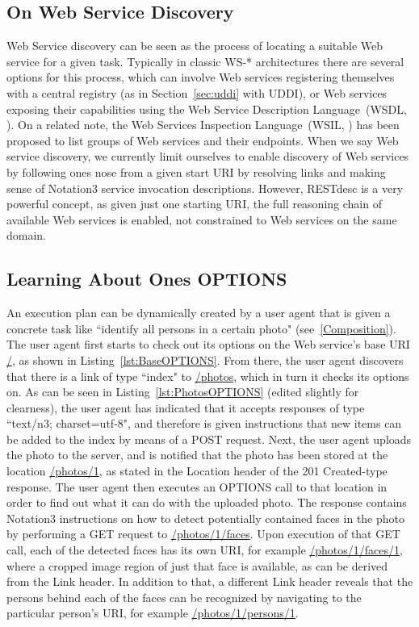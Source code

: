 \documentclass[runningheads,a4paper, twocolumn]{llncs}
\begin{document}
\subsection{On Web Service Discovery}
Web Service discovery can be seen as the process of locating a suitable Web service for a given task. Typically in classic WS-* architectures there are several options for this process, which can involve Web services registering themselves with a central registry (as in Section~\ref{sec:uddi} with UDDI), or Web services exposing their capabilities using the Web Service Description Language~(WSDL, \cite{WSDL1, WSDL2}). On a related note, the Web Services Inspection Language~(WSIL, \cite{WSIL}) has been proposed to list groups of Web services and their endpoints. When we say Web service discovery, we currently limit ourselves to enable discovery of Web services by following ones nose from a given start URI by resolving links and making sense of Notation3 service invocation descriptions. However, RESTdesc is a very powerful concept, as given just one starting URI, the full reasoning chain of available Web services is enabled, not constrained to Web services on the same domain.

\subsection{Learning About Ones OPTIONS} \label{MainStory}
An execution plan can be dynamically created by a user agent that is given a concrete task like ``identify all persons in a certain photo" (see~\ref{Composition}). The user agent first starts to check out its options on the Web service's base URI \url{/}, as shown in Listing~\ref{lst:BaseOPTIONS}. From there, the user agent discovers that there is a link of type ``index" to \url{/photos}, which in turn it checks its options on. As can be seen in Listing~\ref{lst:PhotosOPTIONS} (edited slightly for clearness), the user agent has indicated that it accepts responses of type ``text/n3; charset=utf-8", and therefore is given instructions that new items can be added to the index by means of a POST request. Next, the user agent uploads the photo to the server, and is notified that the photo has been stored at the location \url{/photos/1}, as stated in the Location header of the 201 Created-type response. The user agent then executes an OPTIONS call to that location in order to find out what it can do with the uploaded photo. The response contains Notation3 instructions on how to detect potentially contained faces in the photo by performing a GET request to \url{/photos/1/faces}.  Upon execution of that GET call, each of the detected faces has its own URI, for example \url{/photos/1/faces/1}, where a cropped image region of just that face is available, as can be derived from the Link header. In addition to that, a different Link header reveals that the persons behind each of the faces can be recognized by navigating to the particular person's URI, for example \url{/photos/1/persons/1}.
\end{document}

